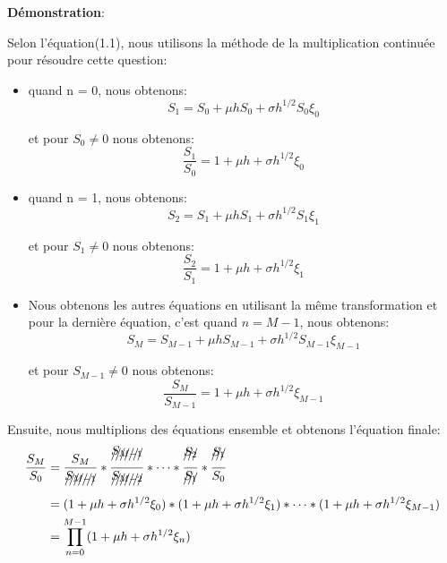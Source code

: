 \documentclass[a4paper,10pt]{report}
\begin{document}
\noindent \textbf{Démonstration}:
\par \noindent Selon l'équation(1.1), nous utilisons la méthode de la multiplication continuée pour résoudre cette question:
\begin{itemize}
	\item quand n = 0, nous obtenons:
	\begin{equation}
	S_{1} = S_{0} + \mu h S_{0} + \sigma h^{1/2} S_{0} \xi_{0}
	\end{equation} 
	\par et pour $S_{0} \neq 0$ nous obtenons:
	\begin{equation}
	\frac{S_{1}}{S_{0}} = 1 + \mu h + \sigma h^{1/2} \xi_{0}
	\end{equation} 
	
	\item quand n = 1, nous obtenons:
	\begin{equation}
	S_{2} = S_{1} + \mu h S_{1} + \sigma h^{1/2} S_{1} \xi_{1}
	\end{equation}
	\par et pour $S_{1} \neq 0$ nous obtenons:
	\begin{equation}
	\frac{S_{2}}{S_{1}} = 1 + \mu h + \sigma h^{1/2} \xi_{1}
	\end{equation} 	
	
	\item Nous obtenons les autres équations en utilisant la même transformation et pour la dernière équation, c'est quand $n = M - 1$, nous obtenons:
	\begin{equation}
	S_{M} = S_{M-1} + \mu h S_{M-1} + \sigma h^{1/2} S_{M-1} \xi_{M-1}
	\end{equation}
	\par et pour $S_{M-1} \neq 0$ nous obtenons:
	\begin{equation}
	\frac{S_{M}}{S_{M-1}} = 1 + \mu h + \sigma h^{1/2} \xi_{M-1}
	\end{equation}
\end{itemize}

\par\noindent Ensuite, nous multiplions des équations ensemble et obtenons l'équation finale: 
\begin{align*}
	\frac{S_{M}}{S_{0}} &= \frac{S_{M}}{\xout{S_{M-1}}} * \frac{\xout{S_{M-1}}}{\xout{S_{M-2}}} *\dots * \frac{\xout{S_{2}}}{\xout{S_{1}}} * \frac{\xout{S_{1}}}{S_{0}}\\
&= (1 + \mu h + \sigma h^{1/2} \xi_{0}) * (1 + \mu h + \sigma h^{1/2} \xi_{1}) * \dots * (1 + \mu h + \sigma h^{1/2} \xi_{M-1})\\
&= \prod_{n=0}^{M-1} (1 + \mu h + \sigma h^{1/2} \xi_{n})
\end{align*}
 
\end{document}
